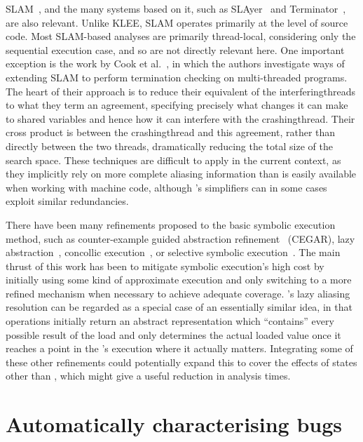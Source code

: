 SLAM~\cite{Ball2011}, and the many systems based on it, such as
SLAyer~\cite{Berdine2011} and Terminator~\cite{Cook2006a}, are also
relevant.  Unlike KLEE, SLAM operates primarily at the level of source
code.  Most SLAM-based analyses are primarily thread-local,
considering only the sequential execution case, and so are not
directly relevant here.  One important exception is the work by Cook
et al.~\cite{Cook2007}, in which the authors investigate ways of
extending SLAM to perform termination checking on multi-threaded
programs.  The heart of their approach is to reduce their equivalent
of the \glspl{interferingthread} to what they term an agreement,
specifying precisely what changes it can make to shared variables and
hence how it can interfere with the \gls{crashingthread}.  Their cross
product is between the \gls{crashingthread} and this agreement, rather
than directly between the two threads, dramatically reducing the total
size of the search space.  These techniques are difficult to apply in
the current context, as they implicitly rely on more complete aliasing
information than is easily available when working with machine code,
although {\technique}'s simplifiers can in some cases exploit similar
redundancies.

There have been many refinements proposed to the basic symbolic
execution method, such as counter-example guided abstraction
refinement~\cite{Clarke2003} (CEGAR), lazy
abstraction~\cite{Henzinger2002}, concollic execution~\cite{Sen2005},
or selective symbolic execution~\cite{Chipounov2011}.  The main thrust
of this work has been to mitigate symbolic execution's high cost by
initially using some kind of approximate execution and only switching
to a more refined mechanism when necessary to achieve adequate
coverage.  {\Technique}'s lazy aliasing resolution can be regarded as
a special case of an essentially similar idea, in that 
operations initially return an abstract representation which
``contains'' every possible result of the load and {\technique} only
determines the actual loaded value once it reaches a point in the
{\StateMachine}'s execution where it actually matters.  Integrating
some of these other refinements could potentially expand this to cover
the effects of states other than , which might give a
useful reduction in analysis times.

\section{Automatically characterising bugs}
\label{sect:rw:auto_characterise}

